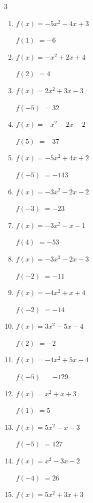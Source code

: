 \begin{multicols}{3}
\begin{enumerate}
$f(-5)$
        $= 35$

\columnbreak %

  \item $f(x)=-5x^{2}-4x+3$

$f(1)$
        $= -6$

  \item $f(x)=-x^{2}+2x+4$

$f(2)$
        $= 4$

  \item $f(x)=2x^{2}+3x-3$

$f(-5)$
        $= 32$

  \item $f(x)=-x^{2}-2x-2$

$f(5)$
        $= -37$

  \item $f(x)=-5x^{2}+4x+2$

$f(-5)$
        $= -143$

  \item $f(x)=-3x^{2}-2x-2$

$f(-3)$
        $= -23$

  \item $f(x)=-3x^{2}-x-1$

$f(4)$
        $= -53$

  \item $f(x)=-3x^{2}-2x-3$

$f(-2)$
        $= -11$

  \item $f(x)=-4x^{2}+x+4$

$f(-2)$
        $= -14$

  \item $f(x)=3x^{2}-5x-4$

$f(2)$
        $= -2$

  \item $f(x)=-4x^{2}+5x-4$

$f(-5)$
        $= -129$

  \item $f(x)=x^{2}+x+3$

$f(1)$
        $= 5$

  \item $f(x)=5x^{2}-x-3$

$f(-5)$
        $= 127$

  \item $f(x)=x^{2}-3x-2$

$f(-4)$
        $= 26$

  \item $f(x)=5x^{2}+3x+3$


\end{enumerate}
\end{multicols}
